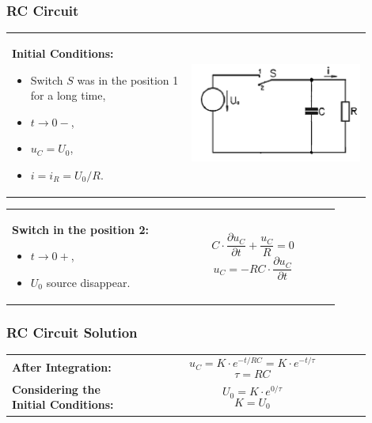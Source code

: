 \documentclass{beamer}
\begin{document}
	\begin{frame}
    \frametitle{RC Circuit}
		\begin{center}
		\begin{tabular}{m{0.45\linewidth} m{0.45\linewidth}}
			\textbf{Initial Conditions: }
			\begin{itemize}
				\item Switch $S$ was in the position 1 for a long time,
				\item $t \longrightarrow 0-$,
				\item $u_C = U_0$,
				\item $i = i_R = U_0/R$.
			\end{itemize}
																					& \includegraphics[scale=0.4]{obr14_obvodRC.png}
		\end{tabular}
		\begin{tabular}{p{0.45\linewidth} p{0.45\linewidth}}
			\textbf{Switch in the position 2: } 
			\begin{itemize}
				\item $t \longrightarrow 0+$,
				\item $U_0$ source disappear.
			\end{itemize}
																					& $$C\cdot \frac{\partial u_C}{\partial t}+\frac{u_C}{R}= 0$$ $$u_C= -RC\cdot \frac{\partial u_C}{\partial t}$$
		\end{tabular}
		\end{center}
  \end{frame}
	\begin{frame}
    \frametitle{RC Circuit Solution}
		\begin{center}
		\begin{tabular}{p{0.33\linewidth} p{0.57\linewidth}}
			\textbf{After Integration: } 				& $$u_C = K\cdot e^{-t/RC}= K\cdot e^{-t/\tau}$$ $$\tau = RC$$\\
			\textbf{Considering the Initial Conditions: }
																					& $$U_0 = K\cdot e^{0/\tau}$$ $$K= U_0$$
		\end{tabular}
		\end{center}
  \end{frame}
\end{document}
